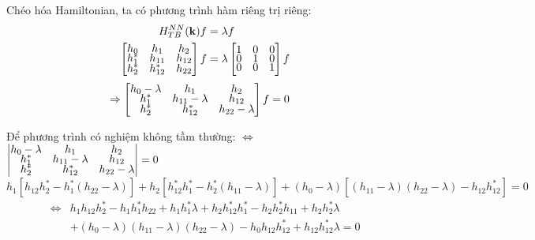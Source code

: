 \documentclass{article}
\begin{document}
Chéo hóa Hamiltonian, ta có phương trình hàm riêng trị riêng:
\begin{align*}
    H_{TB}^{NN}(\mathbf{k}) f & = \lambda f \\
    \begin{bmatrix}
        \renewcommand{\arraystretch}{0.72}
        h_0   & h_1      & h_2    \\
        h_1^* & h_{11}   & h_{12} \\
        h_2^* & h_{12}^* & h_{22}
    \end{bmatrix}f
                              & = \lambda
    \begin{bmatrix}
        \renewcommand{\arraystretch}{0.72}
        1 & 0 & 0 \\
        0 & 1 & 0 \\
        0 & 0 & 1 \\
    \end{bmatrix}f
\end{align*}
\begin{align*}
    \Rightarrow
    \begin{bmatrix}
        \renewcommand{\arraystretch}{0.72}
        h_0 - \lambda & h_1              & h_2              \\
        h_1^*         & h_{11} - \lambda & h_{12}           \\
        h_2^*         & h_{12}^*         & h_{22} - \lambda
    \end{bmatrix}f
     & = 0
\end{align*}

Để phương trình có nghiệm không tầm thường: $\Leftrightarrow$
$
    \begin{vmatrix}
        \renewcommand{\arraystretch}{0.5}
        h_0 - \lambda & h_1              & h_2              \\
        h_1^*         & h_{11} - \lambda & h_{12}           \\
        h_2^*         & h_{12}^*         & h_{22} - \lambda
    \end{vmatrix} = 0
$
\begin{equation*}
    h_{1}^{}\left[h_{12}^{}h_2^* - h_1^*(h_{22}^{} - \lambda)\right] + h_2^{}\left[h_{12}^* h_1^* - h_2^*(h_{11}^{} - \lambda) \right] + (h_0^{} - \lambda)\left[(h_{11}^{} - \lambda)(h_{22}^{} - \lambda) - h_{12}^{}h_{12}^*\right] = 0
\end{equation*}
\begin{align*}
    \Leftrightarrow & h_{1}^{} h_{12}^{} h_2^{*} - h_{1}^{} h_{1}^{*} h_{22}^{} + h_{1}^{} h_{1}^{*} \lambda + h_{2}^{} h_{12}^{*} h_1^{*} - h_{2}^{} h_{2}^{*} h_{11} + h_{2}^{} h_{2}^{*} \lambda \\
                    & + (h_{0}^{} - \lambda) (h_{11}^{} - \lambda) (h_{22}^{} - \lambda) - h_{0}^{} h_{12}^{} h_{12}^{*} + h_{12}^{} h_{12}^{*} \lambda = 0
\end{align*}
\end{document}
